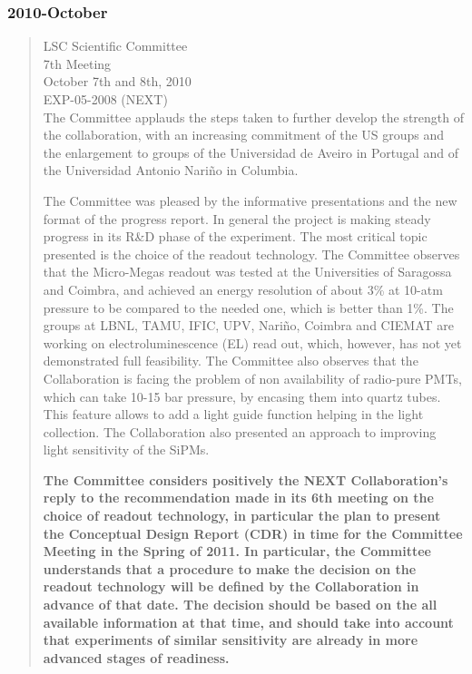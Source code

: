 \subsubsection*{2010-October}
\begin{quotation}
LSC Scientific Committee\\
7th Meeting\\
October 7th and 8th, 2010\\
EXP-05-2008 (NEXT)\\

The Committee applauds the steps taken to further develop the strength of the collaboration, with an increasing commitment of the US groups and the enlargement to groups of the Universidad de Aveiro in Portugal and of the Universidad Antonio Nari\~no in Columbia.

The Committee was pleased by the informative presentations and the new format of the progress report. In general the project is making steady progress in its R\&D phase of the experiment. The most critical topic presented is the choice of the readout technology. The Committee observes that the Micro-Megas readout was tested at the Universities of Saragossa and Coimbra, and achieved an energy resolution of about 3\% at 10-atm pressure to be compared to the needed one, which is better than 1\%. The groups at LBNL, TAMU, IFIC, UPV, Nari\~no, Coimbra and CIEMAT are working on electroluminescence (EL) read out, which, however, has not yet demonstrated full feasibility. The Committee also observes that the Collaboration is facing the problem of non availability of radio-pure PMTs, which can take 10-15 bar pressure, by encasing them into quartz tubes. This feature allows to add a light guide function helping in the light collection. The Collaboration also presented an approach to improving light sensitivity of the SiPMs. 

{\bf
The Committee considers positively the NEXT Collaboration's reply to the recommendation made in its 6th meeting on the choice of readout technology, in particular the plan to present the Conceptual Design Report (CDR) in time for the Committee Meeting in the Spring of 2011. In particular, the Committee understands that a procedure to make the decision on the readout technology will be defined by the Collaboration in advance of that date. The decision should be based on the all available information at that time, and should take into account that experiments of similar sensitivity are already in more advanced stages of readiness.}
 

\end{quotation}
